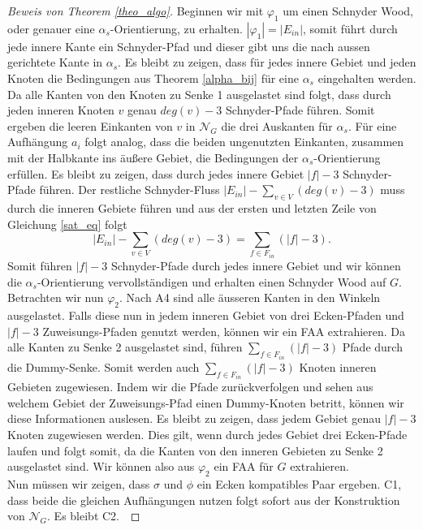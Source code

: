 \begin{proof}[Beweis von Theorem \ref{theo_algo}]
Beginnen wir mit $\varphi_1$ um einen Schnyder Wood, oder genauer eine $\alpha_s$-Orientierung, zu erhalten. $|\varphi_1| = |E_{in}|$, somit führt durch jede innere Kante ein Schnyder-Pfad und dieser gibt uns die nach aussen gerichtete Kante in $\alpha_s$. Es bleibt zu zeigen, dass für jedes innere Gebiet und jeden Knoten die Bedingungen aus Theorem \ref{alpha_bij} für eine $\alpha_s$ eingehalten werden. Da alle Kanten von den Knoten zu Senke 1 ausgelastet sind folgt, dass durch jeden inneren Knoten $v$ genau $deg(v)-3$ Schnyder-Pfade führen. Somit ergeben die leeren Einkanten von $v$ in $\mathcal{N}_G$ die drei Auskanten für $\alpha_s$. Für eine Aufhängung $a_i$ folgt analog, dass die beiden ungenutzten Einkanten, zusammen mit der Halbkante ins äußere Gebiet, die Bedingungen der $\alpha_s$-Orientierung erfüllen. Es bleibt zu zeigen, dass durch jedes innere Gebiet $|f|-3$ Schnyder-Pfade führen. Der restliche Schnyder-Fluss $|E_{in}| - \sum_{v \in V} (deg(v)-3)$ muss durch die inneren Gebiete führen und aus der ersten und letzten Zeile von Gleichung \ref{sat_eq} folgt $$|E_{in}| - \sum_{v \in V} (deg(v)-3) = \sum_{f \in F_{in}} (|f|-3).$$
Somit führen $|f|-3$ Schnyder-Pfade durch jedes innere Gebiet und wir können die $\alpha_s$-Orientierung vervollständigen und erhalten einen Schnyder Wood auf $G$.\\

Betrachten wir nun $\varphi_2$. Nach A4 sind alle äusseren Kanten in den Winkeln ausgelastet. Falls diese nun in jedem inneren Gebiet von drei Ecken-Pfaden und $|f|-3$ Zuweisungs-Pfaden genutzt werden, können wir ein FAA extrahieren. Da alle Kanten zu Senke 2 ausgelastet sind, führen $\sum_{f \in F_{in}} (|f|-3)$ Pfade durch die Dummy-Senke. Somit werden auch $\sum_{f \in F_{in}} (|f|-3)$ Knoten inneren Gebieten zugewiesen. Indem wir die Pfade zurückverfolgen und sehen aus welchem Gebiet der Zuweisungs-Pfad einen Dummy-Knoten betritt, können wir diese Informationen auslesen. Es bleibt zu zeigen, dass jedem Gebiet genau $|f|-3$ Knoten zugewiesen werden. Dies gilt, wenn durch jedes Gebiet drei Ecken-Pfade laufen und folgt somit, da die Kanten von den inneren Gebieten zu Senke 2 ausgelastet sind. Wir können also aus $\varphi_2$ ein FAA für $G$ extrahieren. \\

Nun müssen wir zeigen, dass $\sigma$ und $\phi$ ein Ecken kompatibles Paar ergeben. C1, dass beide die gleichen Aufhängungen nutzen folgt sofort aus der Konstruktion von $\mathcal{N}_G$. Es bleibt C2.\


\end{proof}

